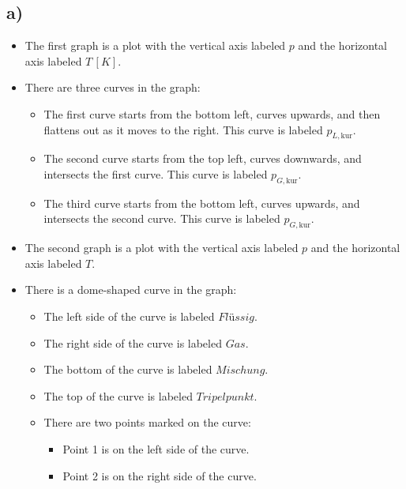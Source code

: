 

\subsection*{a)}

\begin{itemize}
    \item The first graph is a plot with the vertical axis labeled \( p \) and the horizontal axis labeled \( T \, [K] \).
    \item There are three curves in the graph:
        \begin{itemize}
            \item The first curve starts from the bottom left, curves upwards, and then flattens out as it moves to the right. This curve is labeled \( p_{L, \text{kur}} \).
            \item The second curve starts from the top left, curves downwards, and intersects the first curve. This curve is labeled \( p_{G, \text{kur}} \).
            \item The third curve starts from the bottom left, curves upwards, and intersects the second curve. This curve is labeled \( p_{G, \text{kur}} \).
        \end{itemize}
\end{itemize}

\begin{itemize}
    \item The second graph is a plot with the vertical axis labeled \( p \) and the horizontal axis labeled \( T \).
    \item There is a dome-shaped curve in the graph:
        \begin{itemize}
            \item The left side of the curve is labeled \( Flüssig \).
            \item The right side of the curve is labeled \( Gas \).
            \item The bottom of the curve is labeled \( Mischung \).
            \item The top of the curve is labeled \( Tripelpunkt \).
            \item There are two points marked on the curve:
                \begin{itemize}
                    \item Point 1 is on the left side of the curve.
                    \item Point 2 is on the right side of the curve.
                \end{itemize}
        \end{itemize}
\end{itemize}